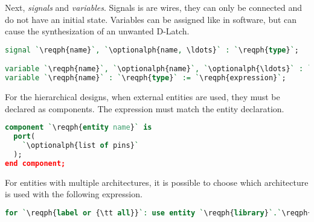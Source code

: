 Next, \emph{signals} and \emph{variables}. Signals is are wires, they can only be
connected and do not have an initial state. Variables can be assigned like in
software, but can cause the synthesization of an unwanted D-Latch.

\begin{lstlisting}[language=vhdl]
signal `\reqph{name}`, `\optionalph{name, \ldots}` : `\reqph{type}`;

variable `\reqph{name}`, `\optionalph{name}`, `\optionalph{\ldots}` : `\reqph{type}`;
variable `\reqph{name}` : `\reqph{type}` := `\reqph{expression}`;
\end{lstlisting}

For the hierarchical designs, when external entities are used, they must be
declared as components. The  expression must match the entity
declaration.
\begin{lstlisting}[language=vhdl]
component `\reqph{entity name}` is
  port(
    `\optionalph{list of pins}`
  );
end component;
\end{lstlisting}
For entities with multiple architectures, it is possible to choose which
architecture is used with the following expression.
\begin{lstlisting}[language=vhdl]
for `\reqph{label or {\tt all}}`: use entity `\reqph{library}`.`\reqph{entity}`(`\reqph{architecture}`);
\end{lstlisting}

